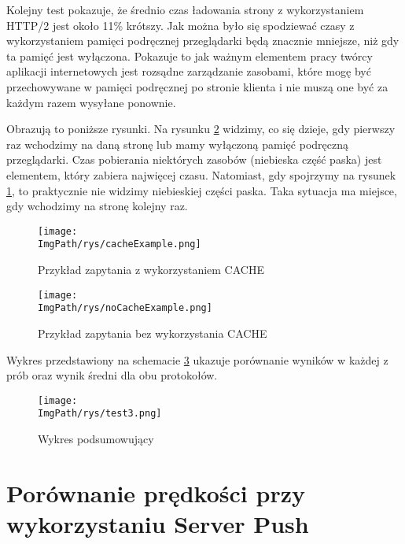 \documentclass[a4paper,12pt,twoside,openany]{report}
\newcommand{\ImgPath}{.}
\begin{document}
Kolejny test pokazuje, że średnio czas ładowania strony z wykorzystaniem HTTP/2 jest około 11\% krótszy.
Jak można było się spodziewać czasy z wykorzystaniem pamięci podręcznej przeglądarki będą znacznie mniejsze, niż gdy ta pamięć jest wyłączona.
Pokazuje to jak ważnym elementem pracy twórcy aplikacji internetowych jest rozsądne zarządzanie zasobami, które mogę być przechowywane w pamięci podręcznej po stronie klienta i nie muszą one być za każdym razem wysyłane ponownie.

Obrazują to poniższe rysunki. Na rysunku \ref{schematNoCacheExample} widzimy, co się dzieje, gdy pierwszy raz wchodzimy na daną stronę lub mamy wyłączoną pamięć podręczną przeglądarki.
Czas pobierania niektórych zasobów (niebieska część paska) jest elementem, który zabiera najwięcej czasu.
Natomiast, gdy spojrzymy na rysunek \ref{schematCacheExample}, to praktycznie nie widzimy niebieskiej części paska.
Taka sytuacja ma miejsce, gdy wchodzimy na stronę kolejny raz.

\begin{figure}[!htbp]
	\begin{center}
\centering
\texttt{[image: \\ImgPath/rys/cacheExample.png]}
\end{center}
	\caption{Przykład zapytania z wykorzystaniem CACHE}
	\label{schematCacheExample}
\end{figure}

\begin{figure}[!htbp]
	\begin{center}
\centering
\texttt{[image: \\ImgPath/rys/noCacheExample.png]}
\end{center}
	\caption{Przykład zapytania bez wykorzystania CACHE}
	\label{schematNoCacheExample}
\end{figure}

Wykres przedstawiony na schemacie \ref{schematTest3} ukazuje porównanie wyników w każdej z prób oraz wynik średni dla obu protokołów.

\begin{figure}[!htbp]
	\begin{center}
\centering
\texttt{[image: \\ImgPath/rys/test3.png]}
\end{center}
	\caption{Wykres podsumowujący}
	\label{schematTest3}
\end{figure}

\section{Porównanie prędkości przy wykorzystaniu Server Push}
\end{document}
